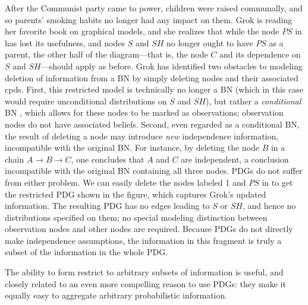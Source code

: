 \begin{example}[restriction]\label{ex:grok-ablate}
  After the Communist party came to power,
  children were raised communally, and so parents' smoking habits no longer had any impact on them. Grok is reading her favorite book on graphical models, and she realizes that while the node $\mathit{PS}$ in  has lost its usefulness, and nodes $S$ and $\mathit{SH}$ no longer ought to have $\mathit{PS}$ as a parent, the other half of the diagram---that is, the node $C$ and its dependence on $S$ and $\mathit{SH}$---should apply as before.
Grok has identified two obstacles to modeling deletion of information from a BN
by simply deleting nodes and their associated cpds. First, this restricted model
is technically no longer a BN (which in this case would require unconditional
distributions on $S$ and $\mathit{SH}$), but rather a \emph{conditional} BN
\cite{KF09}, which allows for these nodes to be marked as observations;
observation nodes do not have associated beliefs. Second, even regarded as a
conditional BN, the result of deleting a node may introduce \emph{new}
independence information, incompatible with the original BN. For instance, by
deleting the node $B$ in a chain $A \rightarrow B \rightarrow C$, one concludes
that $A$ and $C$ are independent, a conclusion incompatible with the original BN
containing all three nodes.   
PDGs do not suffer from either problem.  We can easily delete the
nodes labeled 1 and $PS$ in  to get the
restricted PDG shown in the figure, which captures Grok's updated information.
The resulting PDG has no edges leading to $S$ or $\mathit{SH}$, and hence no
distributions specified on them; no special modeling distinction between
observation nodes and other nodes are required. Because PDGs do not directly
make independence assumptions, the information in this fragment is truly a
subset of the information in the whole PDG. 	
\end{example}

The ability to form restrict to arbitrary subsets of information is useful,
and closely related to an even more compelling reason to use PDGs:
they make it equally easy to aggregate arbitrary probabilistic information. 
	
